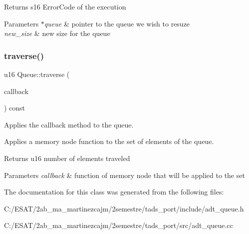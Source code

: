 \begin{DoxyReturn}{Returns}
s16 Error\+Code of the execution 
\end{DoxyReturn}

\begin{DoxyParams}{Parameters}
{\em $\ast$queue} & pointer to the queue we wish to resuze \\
\hline
{\em new\+\_\+size} & new size for the queue \\
\hline
\end{DoxyParams}
\mbox{\label{class_queue_a0e4e61a3568834e25b36625c883cbd38}} 
\subsubsection{\texorpdfstring{traverse()}{traverse()}}
{\footnotesize\ttfamily u16 Queue\+::traverse (\begin{DoxyParamCaption}\item[{s16(Memory\+Node\+::$\ast$)()}]{callback }\end{DoxyParamCaption}) const}



Applies the callback method to the queue. 

Applies a memory node function to the set of elements of the queue.

\begin{DoxyReturn}{Returns}
u16 number of elements traveled 
\end{DoxyReturn}

\begin{DoxyParams}{Parameters}
{\em callback} & function of memory node that will be applied to the set \\
\hline
\end{DoxyParams}


The documentation for this class was generated from the following files\+:\begin{DoxyCompactItemize}
\item 
C\+:/\+E\+S\+A\+T/2ab\+\_\+ma\+\_\+martinezcajm/2semestre/tads\+\_\+port/include/adt\+\_\+queue.\+h\item 
C\+:/\+E\+S\+A\+T/2ab\+\_\+ma\+\_\+martinezcajm/2semestre/tads\+\_\+port/src/adt\+\_\+queue.\+cc\end{DoxyCompactItemize}

